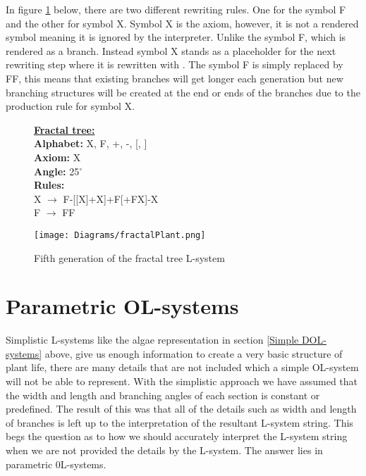 \noindent
In figure \ref{fractal plant} below, there are two different rewriting rules. One for the symbol F and the other for symbol X. Symbol X is the axiom, however, it is not a rendered symbol meaning it is ignored by the interpreter. Unlike the symbol F, which is rendered as a branch. Instead symbol X stands as a placeholder for the next rewriting step where it is rewritten with . The symbol F is simply replaced by FF, this means that existing branches will get longer each generation but new branching structures will be created at the end  or ends of the branches due to the production rule for symbol X.  

\begin{figure}[htbp]
	\raggedright
	\textbf{\underline{Fractal tree:}} \\
	\textbf{Alphabet:} X, F, +, -, [, ] \\
	\textbf{Axiom:} X \\
	\textbf{Angle:} 25$^\circ$ \\
	\textbf{Rules:} \\
	X $\rightarrow$ F-[[X]+X]+F[+FX]-X\\
	F $\rightarrow$ FF \\
	{\centering
		\vspace{7px}
		\texttt{[image: Diagrams/fractalPlant.png]}
		\caption{Fifth generation of the fractal tree L-system} \label{fractal plant}
	}
\end{figure}
\FloatBarrier

\section{Parametric OL-systems} \label{parametric}

Simplistic L-systems like the algae representation in section \ref{Simple DOL-systems} above, give us enough information to create a very basic structure of plant life, there are many details that are not included which a simple OL-system will not be able to represent. With the simplistic approach we have assumed that the width and length and branching angles of each section is constant or predefined. The result of this was that all of the details such as width and length of branches is left up to the interpretation of the resultant L-system string. This begs the question as to how we should accurately interpret the L-system string when we are not provided the details by the L-system. The answer lies in parametric 0L-systems.

